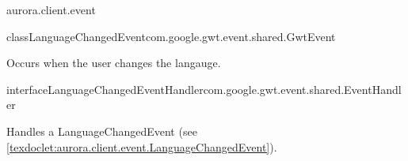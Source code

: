 \begin{texdocpackage}{aurora.client.event}
\begin{texdocclass}{class}{LanguageChangedEvent}{com.google.gwt.event.shared.GwtEvent}{}
\label{texdoclet:aurora.client.event.LanguageChangedEvent}
\begin{texdocclassintro}
Occurs when the user changes the langauge.\end{texdocclassintro}
\begin{texdocclassfields}
\end{texdocclassfields}
\begin{texdocclassconstructors}
\end{texdocclassconstructors}
\begin{texdocclassmethods}
\end{texdocclassmethods}
\end{texdocclass}


\begin{texdocclass}{interface}{LanguageChangedEventHandler}{}{com.google.gwt.event.shared.EventHandler}
\label{texdoclet:aurora.client.event.LanguageChangedEventHandler}
\begin{texdocclassintro}
Handles a LanguageChangedEvent (see \ref{texdoclet:aurora.client.event.LanguageChangedEvent}).\end{texdocclassintro}
\begin{texdocclassmethods}
\end{texdocclassmethods}
\end{texdocclass}



\end{texdocpackage}
